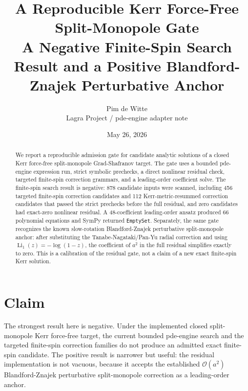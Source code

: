 \documentclass[11pt]{article}
\title{\textbf{A Reproducible Kerr Force-Free Split-Monopole Gate}\\
\large A Negative Finite-Spin Search Result and a Positive Blandford-Znajek Perturbative Anchor}
\author{Pim de Witte \\
Lagra Project / pde-engine adapter note}
\date{May 26, 2026}
\newcommand{\code}[1]{\texttt{#1}}
\newcommand{\Order}[1]{\ensuremath{\mathcal{O}\!\left(#1\right)}}
\begin{document}
\maketitle

\begin{abstract}
We report a reproducible admission gate for candidate analytic solutions of a
closed Kerr force-free split-monopole Grad-Shafranov target.  The gate uses a
bounded pde-engine expression run, strict symbolic prechecks, a direct nonlinear
residual check, targeted finite-spin correction grammars, and a leading-order
coefficient solve.  The finite-spin search result is negative: 878 candidate
inputs were scanned, including 456 targeted finite-spin correction candidates
and 112 Kerr-metric-resummed correction candidates that passed the strict
prechecks before the full residual, and zero candidates had exact-zero
nonlinear residual.  A 48-coefficient leading-order ansatz produced 66
polynomial equations and SymPy returned \code{EmptySet}.  Separately, the same
gate recognizes the known slow-rotation Blandford-Znajek perturbative
split-monopole anchor: after substituting the Tanabe-Nagataki/Pan-Yu radial
correction and using $\operatorname{Li}_{1}(z)=-\log(1-z)$, the coefficient of
$a^2$ in the full residual simplifies exactly to zero.  This is a calibration
of the residual gate, not a claim of a new exact finite-spin Kerr solution.
\end{abstract}

\section{Claim}

The strongest result here is negative.  Under the implemented closed
split-monopole Kerr force-free target, the current bounded pde-engine search and
the targeted finite-spin correction families do not produce an admitted exact
finite-spin candidate.  The positive result is narrower but useful: the
residual implementation is not vacuous, because it accepts the established
\Order{a^2} Blandford-Znajek perturbative split-monopole correction as a
leading-order anchor.
\end{document}
